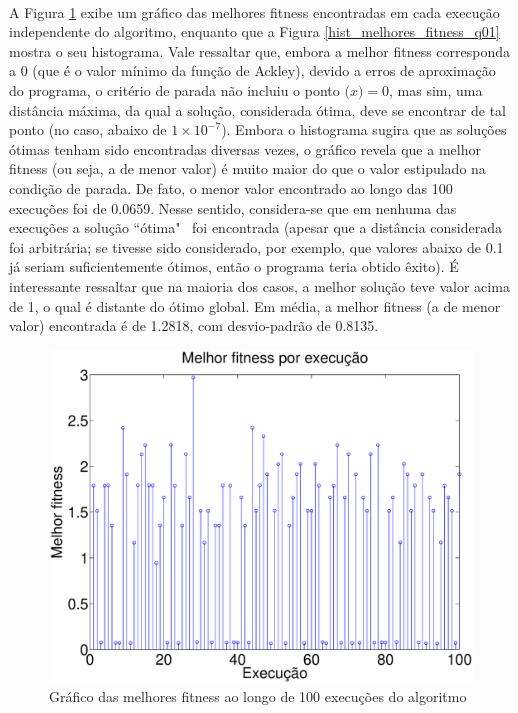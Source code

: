 \documentclass{report}
\begin{document}
\paragraph{} A Figura \ref{melhores_fitness_q01} exibe um gráfico das melhores fitness encontradas em cada execução independente do algoritmo, enquanto que a Figura \ref{hist_melhores_fitness_q01} mostra o seu histograma. Vale ressaltar que, embora a melhor fitness corresponda a 0 (que é o valor mínimo da função de Ackley), devido a erros de aproximação do programa, o critério de parada não incluiu o ponto $\mathbf(x) = 0$, mas sim, uma distância máxima, da qual a solução, considerada ótima, deve se encontrar de tal ponto (no caso, abaixo de $1 \times 10^{-7}$). Embora o histograma sugira que as soluções ótimas tenham sido encontradas diversas vezes, o gráfico revela que a melhor fitness (ou seja, a de menor valor) é muito maior do que o valor estipulado na condição de parada. De fato, o menor valor encontrado ao longo das 100 execuções foi de 0.0659. Nesse sentido, considera-se que em nenhuma das execuções a solução ``ótima" \ foi encontrada (apesar que a distância considerada foi arbitrária; se tivesse sido considerado, por exemplo, que valores abaixo de 0.1 já seriam suficientemente ótimos, então o programa teria obtido êxito). É interessante ressaltar que na maioria dos casos, a melhor solução teve valor acima de 1, o qual é distante do ótimo global. Em média, a melhor fitness (a de menor valor) encontrada é de 1.2818, com desvio-padrão de 0.8135. \\

\begin{figure}[H]
	\centering
	\includegraphics[width = \textwidth]{Q01_melhores_fitness}
	\caption{Gráfico das melhores fitness ao longo de 100 execuções do algoritmo}
	\label{melhores_fitness_q01}
\end{figure}
	
\end{document}

